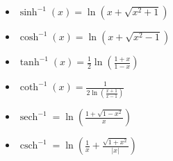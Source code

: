 \begin{itemize}
    
    \item \(\sinh^{-1}(x) = \ln(x + \sqrt{x^2 + 1})\)
    
    \item \(\cosh^{-1}(x) = \ln(x + \sqrt{x^2 - 1})\)
    
    \item \(\tanh^{-1}(x) = \frac{1}{2} \ln\left(\frac{1 + x}{1 - x}\right)\)
    
    \item \(\coth^{-1}(x) = \frac{1}{2 \ln\left(\frac{x + 1}{x - 1}\right)}\)
    
    \item \(\operatorname{sech}^{-1} = \ln\left(\frac{1 + \sqrt{1 - x^2}}{x}\right)\)
    
    \item \(\operatorname{csch}^{-1} = \ln\left( \frac{1}{x} + \frac{\sqrt{1 + x^2}}{|x|}\right)\) 

\end{itemize}